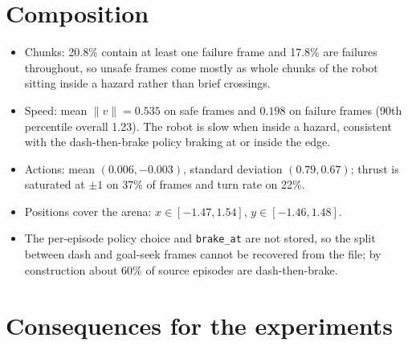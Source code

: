 \documentclass[11pt]{article}
\newcommand{\file}[1]{\nolinkurl{#1}}
\begin{document}
\section{Composition}

\begin{table}[h]
\centering
{}
\caption{Composition of \file{sg_point_ovh224.h5}, from the collection logs (\file{run_logs/sg_point/collect_ovh224_s*.log}) and the merged file.}
\end{table}

\begin{itemize}
\item Chunks: 20.8\% contain at least one failure frame and 17.8\% are failures throughout, so unsafe frames come mostly as whole chunks of the robot sitting inside a hazard rather than brief crossings.
\item Speed: mean $\lVert v \rVert = 0.535$ on safe frames and $0.198$ on failure frames (90th percentile overall 1.23). The robot is slow when inside a hazard, consistent with the dash-then-brake policy braking at or inside the edge.
\item Actions: mean $(0.006, -0.003)$, standard deviation $(0.79, 0.67)$; thrust is saturated at $\pm 1$ on 37\% of frames and turn rate on 22\%.
\item Positions cover the arena: $x \in [-1.47, 1.54]$, $y \in [-1.46, 1.48]$.
\item The per-episode policy choice and \file{brake_at} are not stored, so the split between dash and goal-seek frames cannot be recovered from the file; by construction about 60\% of source episodes are dash-then-brake.
\end{itemize}

\section{Consequences for the experiments}
\end{document}
